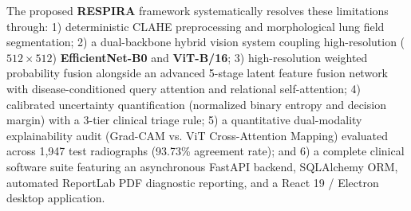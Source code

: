 \documentclass[journal]{IEEEtran}
\begin{document}
The proposed \textbf{RESPIRA} framework systematically resolves these limitations through: 1) deterministic CLAHE preprocessing and morphological lung field segmentation; 2) a dual-backbone hybrid vision system coupling high-resolution ($512 \times 512$) \textbf{EfficientNet-B0} and \textbf{ViT-B/16}; 3) high-resolution weighted probability fusion alongside an advanced 5-stage latent feature fusion network with disease-conditioned query attention and relational self-attention; 4) calibrated uncertainty quantification (normalized binary entropy and decision margin) with a 3-tier clinical triage rule; 5) a quantitative dual-modality explainability audit (Grad-CAM vs. ViT Cross-Attention Mapping) evaluated across 1,947 test radiographs (93.73\% agreement rate); and 6) a complete clinical software suite featuring an asynchronous FastAPI backend, SQLAlchemy ORM, automated ReportLab PDF diagnostic reporting, and a React 19 / Electron desktop application.
\end{document}
